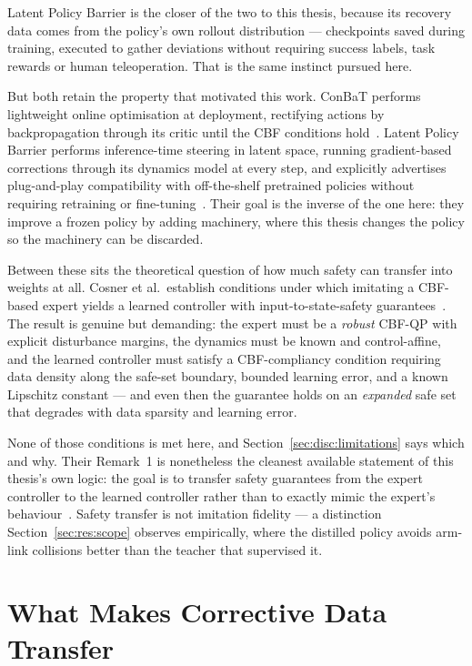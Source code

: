 \documentclass[a4paper,11pt]{report}
\begin{document}
Latent Policy Barrier is the closer of the two to this thesis, because its recovery data comes from
the policy's own rollout distribution --- checkpoints saved during training, executed to gather
deviations without requiring success labels, task rewards or human teleoperation. That is the same
instinct pursued here.

But both retain the property that motivated this work. ConBaT performs lightweight online
optimisation at deployment, rectifying actions by backpropagation through its critic until the CBF
conditions hold~\cite{meng2024conbat}. Latent Policy Barrier performs inference-time steering in
latent space, running gradient-based corrections through its dynamics model at every step, and
explicitly advertises plug-and-play compatibility with off-the-shelf pretrained policies without
requiring retraining or fine-tuning~\cite{sun2025lpb}. Their goal is the inverse of the one here:
they improve a frozen policy by adding machinery, where this thesis changes the policy so the
machinery can be discarded.

Between these sits the theoretical question of how much safety can transfer into weights at all.
Cosner et al.\ establish conditions under which imitating a CBF-based expert yields a learned
controller with input-to-state-safety guarantees~\cite{cosner2022il_cbf}. The result is genuine but
demanding: the expert must be a \emph{robust} CBF-QP with explicit disturbance margins, the
dynamics must be known and control-affine, and the learned controller must satisfy a
CBF-compliancy condition requiring data density along the safe-set boundary, bounded learning
error, and a known Lipschitz constant --- and even then the guarantee holds on an \emph{expanded}
safe set that degrades with data sparsity and learning error.

None of those conditions is met here, and Section~\ref{sec:disc:limitations} says which and why.
Their Remark~1 is nonetheless the cleanest available statement of this thesis's own logic: the goal
is to transfer safety guarantees from the expert controller to the learned controller rather than
to exactly mimic the expert's behaviour~\cite{cosner2022il_cbf}. Safety transfer is not imitation
fidelity --- a distinction Section~\ref{sec:res:scope} observes empirically, where the distilled
policy avoids arm-link collisions better than the teacher that supervised it.

\section{What Makes Corrective Data Transfer}\label{sec:bg:corrective}
\end{document}
